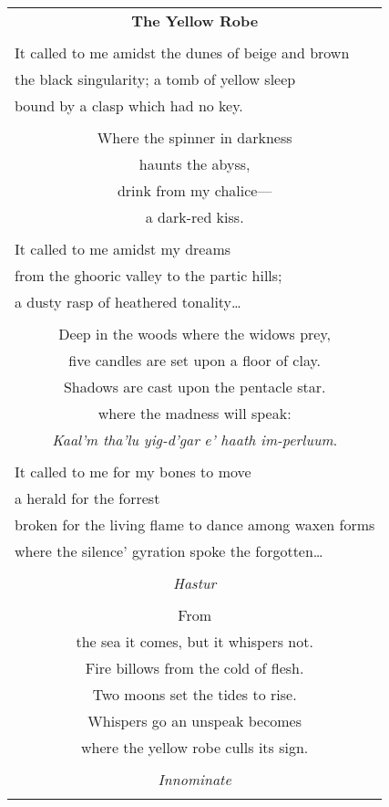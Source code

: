 \documentclass{article}
\begin{document}
\newcommand{\h}{\hspace*{4ex}}

\begin{center}
\begin{tabular}{l}
\multicolumn{1}{c}{\large\textbf{The Yellow Robe}} \\
\\
It called to me amidst the dunes of beige and brown \\
the black singularity; a tomb of yellow sleep \\
bound by a clasp which had no key. \\
\\
\multicolumn{1}{c}{Where the spinner in darkness} \\
\multicolumn{1}{c}{haunts the abyss,} \\
\multicolumn{1}{c}{drink from my chalice---} \\
\multicolumn{1}{c}{a dark-red kiss.} \\
\\
It called to me amidst my dreams \\
from the ghooric valley to the partic hills; \\
a dusty rasp of heathered tonality\ldots{} \\
\\
\multicolumn{1}{c}{Deep in the woods where the widows prey,} \\
\multicolumn{1}{c}{five candles are set upon a floor of clay.} \\
\multicolumn{1}{c}{Shadows are cast upon the pentacle star.} \\
\multicolumn{1}{c}{where the madness will speak:} \\
\multicolumn{1}{c}{
	\textit{Kaal'm tha'lu yig-d'gar} %
	\textit{e' haath im-perluum}.    %
} \\ %
\\
It called to me for my bones to move \\
a herald for the forrest \\
broken for the living flame to dance among waxen forms \\
where the silence' gyration spoke the forgotten\ldots{} \\
\\
\multicolumn{1}{c}{\textit{Hastur}} \\
\\
\multicolumn{1}{c}{From} \\
\multicolumn{1}{c}{the sea it comes, but it whispers not.} \\
\multicolumn{1}{c}{Fire billows from the cold of flesh.} \\
\multicolumn{1}{c}{Two moons set the tides to rise.} \\
\multicolumn{1}{c}{Whispers go an unspeak becomes} \\
\multicolumn{1}{c}{where the yellow robe culls its sign.} \\
\\
\multicolumn{1}{c}{\textit{Innominate}} \\ %
\\
\end{tabular}
\end{center}
\end{document}
